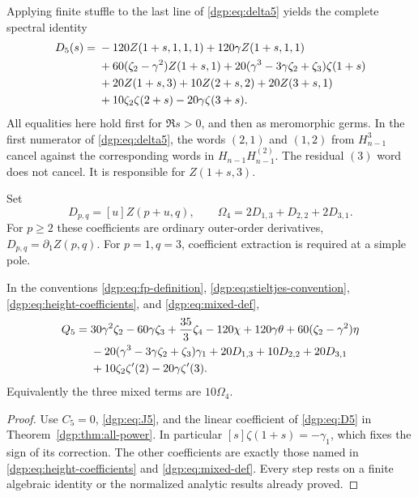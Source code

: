Applying finite stuffle to the last line of \eqref{dgp:eq:delta5} yields
the complete spectral identity
\begin{align}
 D_5(s)={}&-120Z(1+s,1,1,1)+120\gamma Z(1+s,1,1)
 \notag\\
 &+60(\zeta_2-\gamma^2)Z(1+s,1)
       +20(\gamma^3-3\gamma\zeta_2+\zeta_3)\zeta(1+s)
 \notag\\
 &+20Z(1+s,3)+10Z(2+s,2)+20Z(3+s,1)
 \notag\\
 &+10\zeta_2\zeta(2+s)-20\gamma\zeta(3+s).
 \label{dgp:eq:D5}
\end{align}
All equalities here hold first for $\Re s>0$, and then as meromorphic
germs.  In the first numerator of \eqref{dgp:eq:delta5}, the words
$(2,1)$ and $(1,2)$ from $H_{n-1}^3$ cancel against the corresponding
words in $H_{n-1}H_{n-1}^{(2)}$.  The residual $(3)$ word does not
cancel.  It is responsible for $Z(1+s,3)$.

Set
\begin{equation}
 D_{p,q}=[u]Z(p+u,q),\qquad
 \Omega_4=2D_{1,3}+D_{2,2}+2D_{3,1}.
 \label{dgp:eq:mixed-def}
\end{equation}
For $p\ge2$ these coefficients are ordinary outer-order derivatives,
$D_{p,q}=\partial_1Z(p,q)$.  For $p=1,q=3$, coefficient extraction
is required at a simple pole.

\begin{theorem}
\label{dgp:thm:q5}
In the conventions \eqref{dgp:eq:fp-definition},
\eqref{dgp:eq:stieltjes-convention}, \eqref{dgp:eq:height-coefficients}, and
\eqref{dgp:eq:mixed-def},
\begin{align}
 Q_5={}&30\gamma^2\zeta_2-60\gamma\zeta_3+\frac{35}{3}\zeta_4
          -120\chi+120\gamma\theta
          +60(\zeta_2-\gamma^2)\eta
 \notag\\
 &-20(\gamma^3-3\gamma\zeta_2+\zeta_3)\gamma_1
          +20D_{1,3}+10D_{2,2}+20D_{3,1}
 \notag\\
 &+10\zeta_2\zeta'(2)-20\gamma\zeta'(3).
 \label{dgp:eq:Q5}
\end{align}
Equivalently the three mixed terms are $10\Omega_4$.
\end{theorem}

\begin{proof}
Use $C_5=0$, \eqref{dgp:eq:J5}, and the linear coefficient of
\eqref{dgp:eq:D5} in Theorem~\ref{dgp:thm:all-power}.  In particular
$[s]\zeta(1+s)=-\gamma_1$, which fixes the sign of its correction.
The other coefficients are exactly those named in
\eqref{dgp:eq:height-coefficients} and \eqref{dgp:eq:mixed-def}.
Every step rests on a finite algebraic identity or the normalized
analytic results already proved.
\end{proof}

